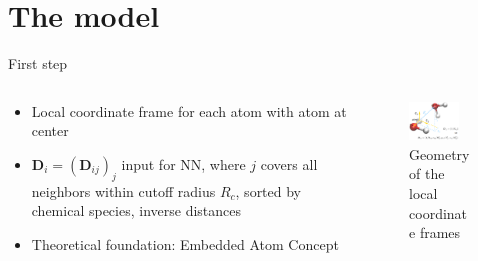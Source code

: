\documentclass[aspectratio=169]{beamer}
\begin{document}
\section{The model}
\begin{frame}{First step}
	\begin{columns}
		\begin{column}{0.5\textwidth}
			\begin{itemize}
				\item<1-> Local coordinate frame for each atom with atom at center
				\item<2-> $\mathbf D_i = (\mathbf D_{ij})_j$ input for NN, where $j$ covers all neighbors within cutoff radius $R_c$, sorted by chemical species, inverse distances
				\item<3-> Theoretical foundation: Embedded Atom Concept
			\end{itemize}
		\end{column}
		\begin{column}{0.5\textwidth}
			\begin{figure}
				
				\centering
				\includegraphics[width=0.8\textwidth]{MD}
				\caption{Geometry of the local coordinate frames \cite{PhysRevLett.120.143001}}
			\end{figure}
		\end{column}
	\end{columns}
\end{frame}
\end{document}
